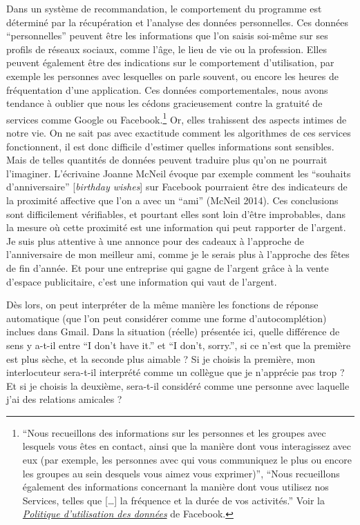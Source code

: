 \documentclass[]{article}
\begin{document}
Dans un système de recommandation, le comportement du programme est
déterminé par la récupération et l'analyse des données personnelles. Ces
données ``personnelles'' peuvent être les informations que l'on saisis
soi-même sur ses profils de réseaux sociaux, comme l'âge, le lieu de vie
ou la profession. Elles peuvent également être des indications sur le
comportement d'utilisation, par exemple les personnes avec lesquelles on
parle souvent, ou encore les heures de fréquentation d'une application.
Ces données comportementales, nous avons tendance à oublier que nous les
cédons gracieusement contre la gratuité de services comme Google ou
Facebook.\footnote{``Nous recueillons des informations sur les personnes
  et les groupes avec lesquels vous êtes en contact, ainsi que la
  manière dont vous interagissez avec eux (par exemple, les personnes
  avec qui vous communiquez le plus ou encore les groupes au sein
  desquels vous aimez vous exprimer)'', ``Nous recueillons également des
  informations concernant la manière dont vous utilisez nos Services,
  telles que {[}\ldots{}{]} la fréquence et la durée de vos activités.''
  Voir la
  \href{https://www.facebook.com/privacy/explanations}{\emph{Politique
  d'utilisation des données}} de Facebook.} Or, elles trahissent des
aspects intimes de notre vie. On ne sait pas avec exactitude comment les
algorithmes de ces services fonctionnent, il est donc difficile
d'estimer quelles informations sont sensibles. Mais de telles quantités
de données peuvent traduire plus qu'on ne pourrait l'imaginer.
L'écrivaine Joanne McNeil évoque par exemple comment les ``souhaits
d'anniversaire'' {[}\emph{birthday wishes}{]} sur Facebook pourraient
être des indicateurs de la proximité affective que l'on a avec un
``ami'' (McNeil 2014). Ces conclusions sont difficilement vérifiables,
et pourtant elles sont loin d'être improbables, dans la mesure où cette
proximité est une information qui peut rapporter de l'argent. Je suis
plus attentive à une annonce pour des cadeaux à l'approche de
l'anniversaire de mon meilleur ami, comme je le serais plus à l'approche
des fêtes de fin d'année. Et pour une entreprise qui gagne de l'argent
grâce à la vente d'espace publicitaire, c'est une information qui vaut
de l'argent.

Dès lors, on peut interpréter de la même manière les fonctions de
réponse automatique (que l'on peut considérer comme une forme
d'autocomplétion) inclues dans Gmail. Dans la situation (réelle)
présentée ici, quelle différence de sens y a-t-il entre ``I don't have
it.'' et ``I don't, sorry.'', si ce n'est que la première est plus
sèche, et la seconde plus aimable ? Si je choisis la première, mon
interlocuteur sera-t-il interprété comme un collègue que je n'apprécie
pas trop ? Et si je choisis la deuxième, sera-t-il considéré comme une
personne avec laquelle j'ai des relations amicales ?
\end{document}
